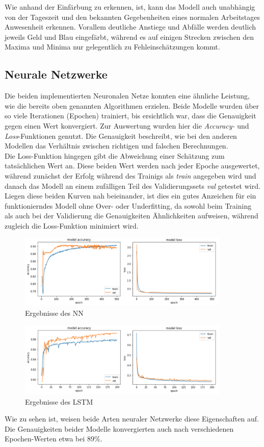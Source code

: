 Wie anhand der Einfärbung zu erkennen, ist, kann das Modell auch unabhängig von der Tageszeit und den bekannten
Gegebenheiten eines normalen Arbeitstages Anwesenheit erkennen. Vorallem deutliche Anstiege und Abfälle
werden deutlich jeweils Geld und Blau eingefärbt, während es auf einigen Strecken zwischen den Maxima und Minima
nur gelegentlich zu Fehleinschätzungen kommt.


\subsection{Neurale Netzwerke}
Die beiden implementierten Neuronalen Netze konnten eine ähnliche Leistung, wie die bereits oben genannten 
Algorithmen erzielen. Beide Modelle wurden über so viele Iterationen (Epochen) trainiert, bis ersichtlich war,
dass die Genauigkeit gegen einen Wert konvergiert. Zur Auswertung wurden hier die \textit{Accuracy-} und 
\textit{Loss}-Funktionen genutzt. Die Genauigkeit beschreibt, wie bei den anderen Modellen das Verhältnis
zwischen richtigen und falschen Berechnungen.\\
Die Loss-Funktion hingegen gibt die Abweichung einer Schätzung zum tatsächlichen Wert an. Diese beiden Wert 
werden nach jeder Epoche ausgewertet, während zunächst der Erfolg während des Trainigs als \textit{train}
angegeben wird und danach das Modell an einem zufälligen Teil des Validierungssets \textit{val} getestet wird.
Liegen diese beiden Kurven nah beieinander, ist dies ein gutes Anzeichen für ein funktionierndes Modell ohne 
Over- oder Underfitting, da sowohl beim Training als auch bei der Validierung die Genauigkeiten Ähnlichkeiten
aufweisen, während zugleich die Loss-Funktion minimiert wird.

\begin{figure}[h]
    \centering
    \includegraphics[width=0.9\textwidth]{pic/eval_NN.png}
    \caption{Ergebnisse des NN}
    \label{fig:PT_eval}
\end{figure}

\begin{figure}[h]
    \centering
    \includegraphics[width=0.9\textwidth]{pic/eval_LSTM.png}
    \caption{Ergebnisse des LSTM}
    \label{fig:PT_eval}
\end{figure}

Wie zu sehen ist, weisen beide Arten neuraler Netzwerke diese Eigenschaften auf. Die Genauigkeiten beider Modelle
konvergierten auch nach verschiedenen Epochen-Werten etwa bei 89\%.